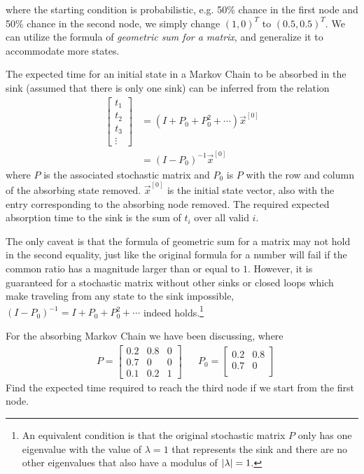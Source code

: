 where the starting condition is probabilistic, e.g. 50\% chance in the first node
and 50\% chance in the second node, we simply change $(1,0)^T$ to $(0.5,0.5)^T$. We can utilize the formula of \textit{geometric sum for a matrix}, and generalize it to accommodate more states.
\begin{proper}
The expected time for an initial state in a Markov Chain to be absorbed in the sink (assumed that there is only one sink) can be inferred from the relation
\begin{align*}
\begin{bmatrix}
t_1 \\
t_2 \\
t_3 \\
\vdots 
\end{bmatrix}
&= (I + P_0 + P_0^2 + \cdots)\vec{x}^{[0]} \\
&= (I - P_0)^{-1}
\vec{x}^{[0]}
\end{align*}
where $P$ is the associated stochastic matrix and $P_0$ is $P$ with the row and column of the absorbing state removed. $\vec{x}^{[0]}$ is the initial state vector, also with the entry corresponding to the absorbing node removed. The required expected absorption time to the sink is the sum of $t_i$ over all valid $i$. 
\end{proper}
The only caveat is that the formula of geometric sum for a matrix may not hold in the second equality, just like the original formula for a number will fail if the common ratio has a magnitude larger than or equal to $1$. However, it is guaranteed for a stochastic matrix without other sinks or closed loops which make traveling from any state to the sink impossible, $(I - P_0)^{-1} = I + P_0 + P_0^2 + \cdots$ indeed holds.\footnote{An equivalent condition is that the original stochastic matrix $P$ only has one eigenvalue with the value of $\lambda = 1$ that represents the sink and there are no other eigenvalues that also have a modulus of $\abs{\lambda} = 1$.}
\begin{exmp}
For the absorbing Markov Chain we have been discussing, where
\begin{align*}
& P = 
\begin{bmatrix}
0.2 & 0.8 & 0 \\
0.7 & 0 & 0 \\
0.1 & 0.2 & 1
\end{bmatrix}
&
& P_0 = 
\begin{bmatrix}
0.2 & 0.8\\
0.7 & 0 \\
\end{bmatrix}   
\end{align*}
Find the expected time required to reach the third node if we start from the first node.
\end{exmp}
